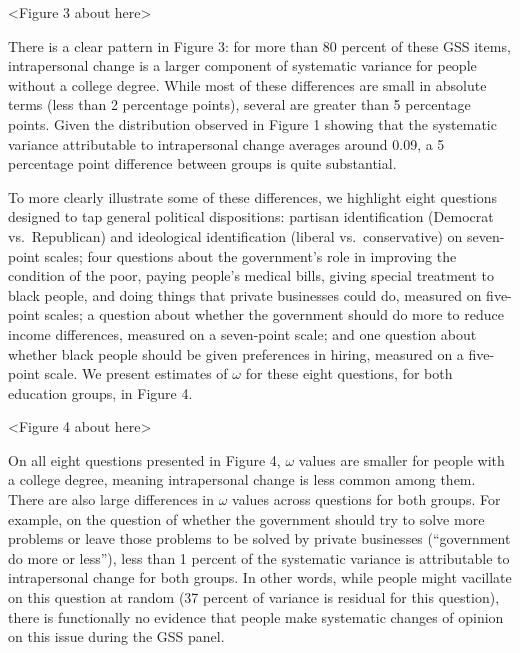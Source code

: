 \documentclass[
  12pt,
]{article}
\begin{document}
\begin{center}
<Figure 3 about here>
\end{center}

There is a clear pattern in Figure 3: for more than 80 percent of these
GSS items, intrapersonal change is a larger component of systematic
variance for people without a college degree. While most of these
differences are small in absolute terms (less than 2 percentage points),
several are greater than 5 percentage points. Given the distribution
observed in Figure 1 showing that the systematic variance attributable
to intrapersonal change averages around 0.09, a 5 percentage point
difference between groups is quite substantial.

To more clearly illustrate some of these differences, we highlight eight
questions designed to tap general political dispositions: partisan
identification (Democrat vs.~Republican) and ideological identification
(liberal vs.~conservative) on seven-point scales; four questions about
the government's role in improving the condition of the poor, paying
people's medical bills, giving special treatment to black people, and
doing things that private businesses could do, measured on five-point
scales; a question about whether the government should do more to reduce
income differences, measured on a seven-point scale; and one question
about whether black people should be given preferences in hiring,
measured on a five-point scale. We present estimates of \(\omega\) for
these eight questions, for both education groups, in Figure 4.

\begin{center}
<Figure 4 about here>
\end{center}

On all eight questions presented in Figure 4, \(\omega\) values are
smaller for people with a college degree, meaning intrapersonal change
is less common among them. There are also large differences in
\(\omega\) values across questions for both groups. For example, on the
question of whether the government should try to solve more problems or
leave those problems to be solved by private businesses (``government do
more or less''), less than 1 percent of the systematic variance is
attributable to intrapersonal change for both groups. In other words,
while people might vacillate on this question at random (37 percent of
variance is residual for this question), there is functionally no
evidence that people make systematic changes of opinion on this issue
during the GSS panel.
\end{document}
